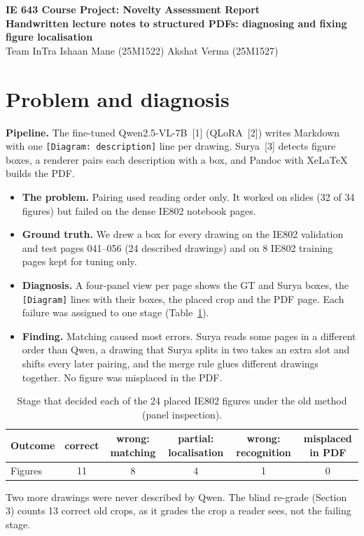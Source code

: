 \documentclass[11pt,a4paper]{article}
\begin{document}
\begin{center}
{\large\bfseries IE 643 Course Project: Novelty Assessment Report}\\[2pt]
{\bfseries Handwritten lecture notes to structured PDFs: diagnosing and fixing figure localisation}\\[2pt]
Team InTra \quad Ishaan Mane (25M1522) \quad Akshat Verma (25M1527)
\end{center}

\section{Problem and diagnosis}
\textbf{Pipeline.} The fine-tuned Qwen2.5-VL-7B~[1] (QLoRA~[2]) writes Markdown with one
\texttt{[Diagram: description]} line per drawing. Surya~[3] detects figure boxes, a renderer pairs each
description with a box, and Pandoc with XeLaTeX builds the PDF.
\begin{itemize}
\item \textbf{The problem.} Pairing used reading order only. It worked on slides (32 of 34 figures) but failed on
the dense IE802 notebook pages.
\item \textbf{Ground truth.} We drew a box for every drawing on the IE802 validation and test pages 041--056
(24 described drawings) and on 8 IE802 training pages kept for tuning only.
\item \textbf{Diagnosis.} A four-panel view per page shows the GT and Surya boxes, the \texttt{[Diagram]} lines
with their boxes, the placed crop and the PDF page. Each failure was assigned to one stage (Table~\ref{tab:diag}).
\item \textbf{Finding.} Matching caused most errors. Surya reads some pages in a different order than Qwen, a
drawing that Surya splits in two takes an extra slot and shifts every later pairing, and the merge rule glues
different drawings together. No figure was misplaced in the PDF.
\end{itemize}

\begin{table}[!h]\centering\small
\caption{Stage that decided each of the 24 placed IE802 figures under the old method (panel inspection).}\label{tab:diag}
\begin{tabular}{lccccc}\toprule
Outcome & correct & wrong: matching & partial: localisation & wrong: recognition & misplaced in PDF\\\midrule
Figures & 11 & 8 & 4 & 1 & 0\\\bottomrule
\end{tabular}
\end{table}
\vspace{-6pt}
{\small Two more drawings were never described by Qwen. The blind re-grade (Section 3) counts 13 correct
old crops, as it grades the crop a reader sees, not the failing stage.}
\end{document}
